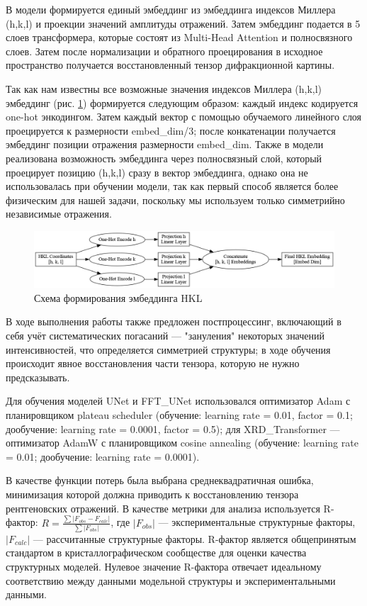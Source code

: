 \documentclass[a4paper,12pt]{article}
\begin{document}
{В модели формируется единый эмбеддинг из эмбеддинга индексов Миллера (h,k,l) и проекции значений амплитуды отражений. Затем эмбеддинг подается в 5 слоев трансформера, которые состоят из Multi-Head Attention и полносвязного слоев. Затем после нормализации и обратного проецирования в исходное пространство получается восстановленный тензор дифракционной картины.

Так как нам известны все возможные значения индексов Миллера (h,k,l) эмбеддинг (рис. \ref{hklembed}) формируется следующим образом: каждый индекс кодируется one-hot энкодингом. Затем каждый вектор с помощью обучаемого линейного слоя проецируется к размерности embed\_dim/3; после конкатенации получается эмбеддинг позиции отражения размерности embed\_dim. Также в модели реализована возможность эмбеддинга через полносвязный слой, который проецирует позицию (h,k,l) сразу в вектор эмбеддинга, однако она не использовалась при обучении модели, так как первый способ является более физическим для нашей задачи, поскольку мы используем только симметрийно независимые отражения.


\begin{figure}[H]
    \centering
    \includegraphics[width=1\textwidth]{hkl_embedding_process.png}
    \caption{Схема формирования эмбеддинга HKL}
    \label{hklembed}
\end{figure}

В ходе выполнения работы также предложен постпроцессинг, включающий в себя учёт систематических погасаний --- "зануления" некоторых значений интенсивностей, что определяется симметрией структуры; в ходе обучения происходит явное восстановления части тензора, которую не нужно предсказывать.

Для обучения моделей UNet и FFT\_UNet использовался оптимизатор Adam с планировщиком plateau scheduler (обучение: learning rate = 0.01, factor = 0.1; дообучение: learning rate = 0.0001, factor = 0.5); для XRD\_Transformer --- оптимизатор AdamW с планировщиком cosine annealing (обучение: learning rate = 0.01; дообучение: learning rate = 0.0001).

В качестве функции потерь была выбрана среднеквадратичная ошибка, минимизация которой должна приводить к восстановлению тензора рентгеновских отражений. В качестве метрики для анализа используется R-фактор: $R = \frac{\sum |F_{obs} - F_{calc}|}{\sum |F_{obs}|}$, где $|F_{obs}|$ --- экспериментальные структурные факторы, $|F_{calc}|$ --- рассчитанные структурные факторы. R-фактор является общепринятым стандартом в кристаллографическом сообществе для оценки качества структурных моделей. Нулевое значение R-фактора отвечает идеальному соответствию между данными модельной структуры и экспериментальными данными.

}
\end{document}
